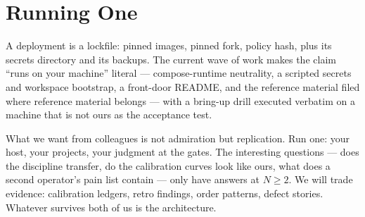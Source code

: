 \section{Running One}

A deployment is a lockfile: pinned images, pinned fork, policy hash, plus its secrets directory and its backups. The current wave of work makes the claim ``runs on your machine'' literal --- compose-runtime neutrality, a scripted secrets and workspace bootstrap, a front-door README, and the reference material filed where reference material belongs --- with a bring-up drill executed verbatim on a machine that is not ours as the acceptance test.

What we want from colleagues is not admiration but replication. Run one: your host, your projects, your judgment at the gates. The interesting questions --- does the discipline transfer, do the calibration curves look like ours, what does a second operator's pain list contain --- only have answers at $N \geq 2$. We will trade evidence: calibration ledgers, retro findings, order patterns, defect stories. Whatever survives both of us is the architecture.
